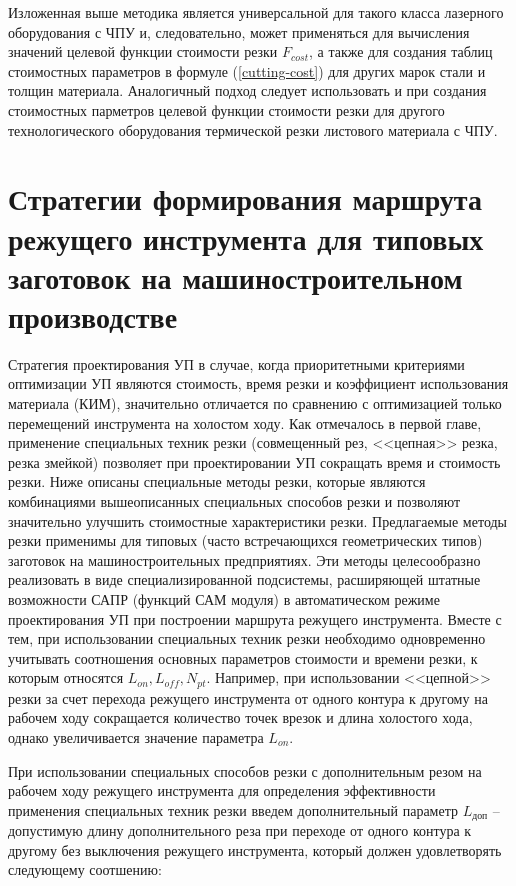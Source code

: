 \documentclass[11pt,twoside,openany]{report}
\begin{document}
Изложенная выше методика является универсальной
для такого класса лазерного оборудования с ЧПУ и,
следовательно, может применяться для вычисления значений
целевой функции стоимости резки
$F_{cost}$,
а также для создания таблиц стоимостных параметров в формуле (\ref{cutting-cost})
для других марок стали и толщин материала.
Аналогичный подход следует использовать и при создания
стоимостных парметров целевой функции стоимости резки
для другого технологического оборудования термической
резки листового материала с ЧПУ.

{\raggedright\section{
  Стратегии формирования маршрута режущего инструмента
  для типовых заготовок на машиностроительном производстве
}}
\label{sect:2.2}
\setcounter{equation}{0}

Стратегия проектирования УП в случае,
когда приоритетными критериями оптимизации УП являются стоимость,
время резки и коэффициент использования материала (КИМ),
значительно отличается по сравнению с оптимизацией
только перемещений инструмента на холостом ходу.
Как отмечалось в первой главе,
применение специальных техник резки
(совмещенный рез, <<цепная>> резка, резка змейкой)
позволяет при проектировании УП сокращать время и стоимость резки.
Ниже описаны специальные методы резки,
которые являются комбинациями вышеописанных специальных способов резки
и позволяют значительно улучшить стоимостные характеристики резки.
Предлагаемые методы резки применимы для типовых
(часто встречающихся геометрических типов)
заготовок на машиностроительных предприятиях.
Эти методы целесообразно реализовать в
виде специализированной подсистемы,
расширяющей штатные возможности САПР (функций САМ модуля)
в автоматическом режиме проектирования УП при построении
маршрута режущего инструмента.
Вместе с тем, при использовании специальных техник
резки необходимо одновременно учитывать соотношения
основных параметров стоимости и времени резки,
к которым относятся
$L_{on}, L_{off}, N_{pt}$.
Например, при использовании <<цепной>> резки
за счет перехода режущего инструмента от одного
контура к другому на рабочем ходу сокращается
количество точек врезок и длина холостого хода,
однако увеличивается значение параметра
$L_{on}$.

При использовании специальных способов резки
с дополнительным резом на рабочем ходу режущего инструмента
для определения эффективности применения специальных
техник резки введем дополнительный параметр
$L_\text{доп}$ -- допустимую длину дополнительного реза
при переходе от одного контура к другому
без выключения режущего инструмента,
который должен удовлетворять следующему соотшению:
\end{document}
